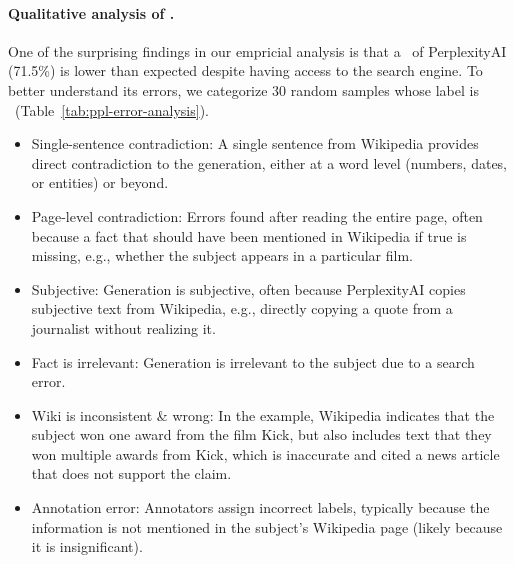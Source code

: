 \vspace{-.3em}
\paragraph{Qualitative analysis of \nsLabel.}
One of the surprising findings in our empricial analysis is that a \ours\ of PerplexityAI (71.5\%) is lower than expected despite having access to the search engine. To better understand its errors, we categorize 30 random samples whose label is \nsLabel\ (Table~\ref{tab:ppl-error-analysis}).
\vspace{-.3em}
\begin{itemize}[leftmargin=12pt]\itemsep -.2em
    \item Single-sentence contradiction: A single sentence from Wikipedia provides direct contradiction to the generation, either at a word level (numbers, dates, or entities) or beyond. %
    \item Page-level contradiction: Errors found after reading the entire page, often because a fact that should have been mentioned in Wikipedia if true is missing, e.g., whether the subject appears in a particular film.
    \item Subjective: Generation is subjective, often because PerplexityAI copies subjective text from Wikipedia, e.g., directly copying a quote from a journalist without realizing it.
    \item Fact is irrelevant: Generation is irrelevant to the subject due to a search error.
    \item Wiki is inconsistent \& wrong: In the example, Wikipedia indicates that the subject won one award from the film Kick, but also includes text that they won multiple awards from Kick, which is inaccurate and cited a news article that does not support the claim.
    \item Annotation error: Annotators assign incorrect labels, typically because the information is not mentioned in the subject's Wikipedia page (likely because it is insignificant). %
\end{itemize}

